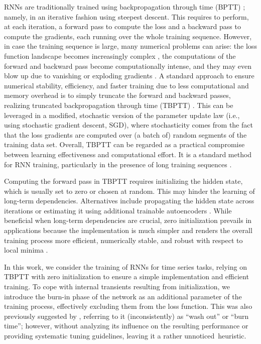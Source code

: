 \documentclass{article} %
\begin{document}
RNNs are traditionally trained using backpropagation through time (BPTT) \citep{Werbos1990}; namely, in an iterative fashion using steepest descent. This requires to perform, at each iteration, a forward pass to compute the loss and a backward pass to compute the gradients, each running over the whole training sequence.
However, in case the training sequence is large, many numerical problems can arise: the loss function landscape becomes increasingly complex \citep{AllenZhu2019,Ribeiro2020}, the computations of the forward and backward pass become computationally intense, and they may even blow up due to vanishing or exploding gradients \citep{Bengio1994,Pascanu2013,Zucchet2024}.
A standard approach to ensure numerical stability, efficiency, and faster training due to less computational and memory overhead is to simply truncate the forward and backward passes, realizing truncated backpropagation through time (TBPTT) \citep{Williams1990}.
This can be leveraged in a modified, stochastic version of the parameter update law (i.e., using stochastic gradient descent, SGD), where stochasticity comes from the fact that the loss gradients are computed over (a batch of) random segments of the training data set.
Overall, TBPTT can be regarded as a practical compromise between learning effectiveness and computational effort. It is a standard method for RNN training, particularly in the presence of long training sequences \citep{Mikolov2011,Tang2018,Aicher2020,Xu2023a}.

Computing the forward pass in TBPTT requires initializing the hidden state, which is usually set to zero or chosen at random.
This may hinder the learning of long-term dependencies. Alternatives include propagating the hidden state across iterations \citep{Xu2023a,Elsworth2020,Katrompas2021} or estimating it using additional trainable autoencoders \citep{Mohajerin2017,Masti2021,Forgione2022,Beintema2021,Beintema2023a}.
While beneficial when long-term dependencies are crucial, zero initialization prevails in applications because the implementation is much simpler and renders the overall training process more efficient, numerically stable, and robust with respect to local minima \citep{Xu2023a,AllenZhu2019}.

In this work, we consider the training of RNNs for time series tasks, relying on TBPTT with zero initialization to ensure a simple implementation and efficient training.
To cope with internal transients resulting from initialization, we introduce the burn-in phase of the network as an additional parameter of the training process, effectively excluding them from the loss function.
This was also previously suggested by \citet{Jaeger2002,Bonassi2022,Beintema2021}, referring to it (inconsistently) as ``wash out'' or ``burn time''; however, without analyzing its influence on the resulting performance or providing systematic tuning guidelines, leaving it a rather unnoticed~heuristic.
\end{document}
